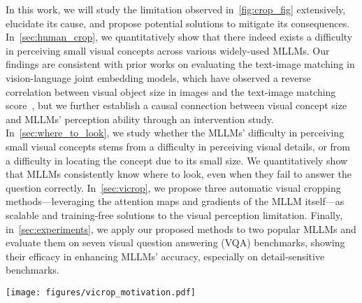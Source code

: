 In this work, we will study the limitation observed in~\cref{fig:crop_fig} extensively, elucidate its cause, and propose potential solutions to mitigate its consequences. In~\cref{sec:human_crop}, we quantitatively show that there indeed exists a difficulty in perceiving small visual concepts across various widely-used MLLMs. Our findings are consistent with prior works on evaluating the text-image matching in vision-language joint embedding models, which have observed a reverse correlation between visual object size in images and the text-image matching score~\citep{vlchecklist}, but we further establish a causal connection between visual concept size and MLLMs' perception ability through an intervention study.
In~\cref{sec:where_to_look}, we study whether the MLLMs' difficulty in perceiving small visual concepts stems from a difficulty in perceiving visual details, or from a difficulty in locating the concept due to its small size. We quantitatively show that MLLMs consistently know where to look, even when they fail to answer the question correctly.
In~\cref{sec:vicrop}, we propose three automatic visual cropping methods---leveraging the attention maps and gradients of the MLLM itself---as scalable and training-free solutions to the visual perception limitation. Finally, in~\cref{sec:experiments}, we apply our proposed methods to two popular MLLMs and evaluate them on seven visual question answering (VQA) benchmarks, showing their efficacy in enhancing MLLMs' accuracy, especially on detail-sensitive benchmarks.

\begin{figure*}[t]
    \centering
    \texttt{[image: figures/vicrop\_motivation.pdf]}
    \caption{The effect of visual cropping on the probability of answers predicted by BLIP-2 FlanT5$_\mathrm{XL}$ zero-shot VQA model. The x-axis labels are indices to the respective cropped images displayed under each plot that the model sees at each step. The model gradually finds the correct answer.}
    \label{fig:crop_fig}
\end{figure*}